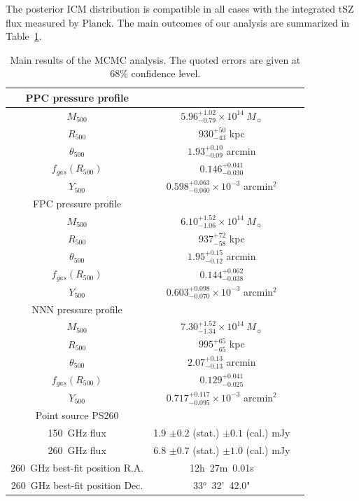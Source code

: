 \documentclass[twocolumn,traditabstract]{aa}
\begin{document}
The posterior ICM distribution is compatible in all cases with the integrated tSZ flux measured by Planck. The main outcomes of our analysis are summarized in Table~\ref{tab:results}. 
\begin{table}
\caption{Main results of the MCMC analysis. The quoted errors are given at 68\% confidence level.}
\begin{center}
\begin{tabular}{ccc}
\hline
\hline
PPC pressure profile \\
\hline
$M_{500}$ & $5.96^{+1.02}_{-0.79} \times 10^{14} \ M_{\sun}$ \\
$R_{500}$ & $930^{+50}_{-43}$ kpc\\
$\theta_{500}$ & $1.93^{+0.10}_{-0.09}$ arcmin\\
$f_{gas}(R_{500})$ & $0.146^{+0.041}_{-0.030}$\\
$Y_{500}$ & $0.598^{+0.063}_{-0.060} \times 10^{-3}$ arcmin$^2$\\
\hline
FPC pressure profile \\
\hline
$M_{500}$ & $6.10^{+1.52}_{-1.06} \times 10^{14} \ M_{\sun}$ \\
$R_{500}$ & $937^{+72}_{-58}$ kpc\\
$\theta_{500}$ & $1.95^{+0.15}_{-0.12}$ arcmin\\
$f_{gas}(R_{500})$ & $0.144^{+0.062}_{-0.038}$\\
$Y_{500}$ & $0.603^{+0.098}_{-0.070} \times 10^{-3}$ arcmin$^2$\\
\hline
NNN pressure profile \\
\hline
$M_{500}$ & $7.30^{+1.52}_{-1.34} \times 10^{14} \ M_{\sun}$ \\
$R_{500}$ & $995^{+65}_{-65}$ kpc\\
$\theta_{500}$ & $2.07^{+0.13}_{-0.13}$ arcmin\\
$f_{gas}(R_{500})$ & $0.129^{+0.041}_{-0.025}$\\
$Y_{500}$ & $0.717^{+0.117}_{-0.095} \times 10^{-3}$ arcmin$^2$\\
\hline
Point source PS260 &\\
\hline
150~GHz flux &  1.9 $\pm 0.2$ (stat.) $\pm 0.1$ (cal.) mJy\\
260~GHz flux & 6.8 $\pm 0.7$ (stat.) $\pm 1.0$ (cal.) mJy\\
260~GHz best-fit position R.A. & 12h~27m~0.01s\\
260~GHz best-fit position Dec. & 33$^o$~32'~42.0"\\
\hline
\end{tabular}
\end{center}
\label{tab:results}
\end{table}
\end{document}
